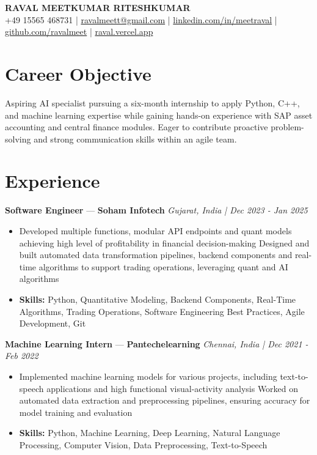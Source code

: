 \documentclass[a4paper,10pt]{article}
\begin{document}
\begin{center}
  {\Large\bfseries RAVAL MEETKUMAR RITESHKUMAR}\\[2pt]
  {\small +49 15565 468731 \;|\; \href{mailto:ravalmeett@gmail.com}{ravalmeett@gmail.com} \;|\; \href{https://www.linkedin.com/in/meetraval/}{linkedin.com/in/meetraval} \;|\; \href{https://github.com/ravalmeet}{github.com/ravalmeet} \;|\; \href{https://raval.vercel.app/}{raval.vercel.app}}
\end{center}
\vspace{-3pt}

\section*{Career Objective}
Aspiring AI specialist pursuing a six-month internship to apply Python, C++, and machine learning expertise while gaining hands-on experience with SAP asset accounting and central finance modules. Eager to contribute proactive problem-solving and strong communication skills within an agile team.\par

\section*{Experience}
\textbf{Software Engineer} — \textbf{Soham Infotech} \hfill \textit{Gujarat, India \;|\; Dec 2023 - Jan 2025}\par
\vspace{1pt}
\begin{itemize}
  \item Developed multiple functions, modular API endpoints and quant models achieving high level of profitability in financial decision-making Designed and built automated data transformation pipelines, backend components and real-time algorithms to support trading operations, leveraging quant and AI algorithms
  \item \textbf{Skills:} Python, Quantitative Modeling, Backend Components, Real-Time Algorithms, Trading Operations, Software Engineering Best Practices, Agile Development, Git
\end{itemize}
\vspace{3pt}
\textbf{Machine Learning Intern} — \textbf{Pantechelearning} \hfill \textit{Chennai, India \;|\; Dec 2021 - Feb 2022}\par
\vspace{1pt}
\begin{itemize}
  \item Implemented machine learning models for various projects, including text-to-speech applications and high functional visual-activity analysis Worked on automated data extraction and preprocessing pipelines, ensuring accuracy for model training and evaluation
  \item \textbf{Skills:} Python, Machine Learning, Deep Learning, Natural Language Processing, Computer Vision, Data Preprocessing, Text-to-Speech
\end{itemize}
\end{document}
